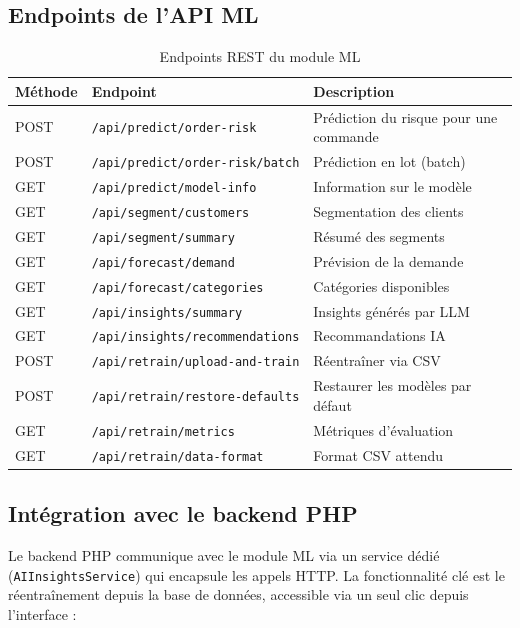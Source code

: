 \documentclass[12pt,a4paper]{report}
\begin{document}
\subsection{Endpoints de l'API ML}

\begin{table}[H]
\centering
\caption{Endpoints REST du module ML}
\label{tab:endpoints}
\begin{tabularx}{\textwidth}{l l X}
\toprule
\textbf{M\'{e}thode} & \textbf{Endpoint} & \textbf{Description} \\
\midrule
POST & \texttt{/api/predict/order-risk} & Pr\'{e}diction du risque pour une commande \\
POST & \texttt{/api/predict/order-risk/batch} & Pr\'{e}diction en lot (batch) \\
GET & \texttt{/api/predict/model-info} & Information sur le mod\`{e}le \\
GET & \texttt{/api/segment/customers} & Segmentation des clients \\
GET & \texttt{/api/segment/summary} & R\'{e}sum\'{e} des segments \\
GET & \texttt{/api/forecast/demand} & Pr\'{e}vision de la demande \\
GET & \texttt{/api/forecast/categories} & Cat\'{e}gories disponibles \\
GET & \texttt{/api/insights/summary} & Insights g\'{e}n\'{e}r\'{e}s par LLM \\
GET & \texttt{/api/insights/recommendations} & Recommandations IA \\
\midrule
POST & \texttt{/api/retrain/upload-and-train} & R\'{e}entra\^{i}ner via CSV \\
POST & \texttt{/api/retrain/restore-defaults} & Restaurer les mod\`{e}les par d\'{e}faut \\
GET & \texttt{/api/retrain/metrics} & M\'{e}triques d'\'{e}valuation \\
GET & \texttt{/api/retrain/data-format} & Format CSV attendu \\
\bottomrule
\end{tabularx}
\end{table}

\subsection{Int\'{e}gration avec le backend PHP}

Le backend PHP communique avec le module ML via un service d\'{e}di\'{e} (\texttt{AIInsightsService}) qui encapsule les appels HTTP. La fonctionnalit\'{e} cl\'{e} est le r\'{e}entra\^{i}nement depuis la base de donn\'{e}es, accessible via un seul clic depuis l'interface :
\end{document}
